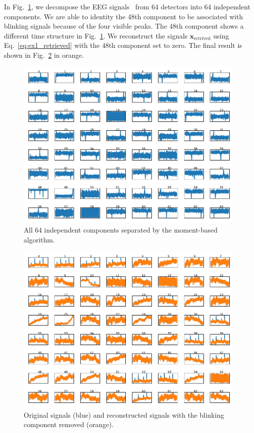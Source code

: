 \documentclass[aps,prl,preprint,superscriptaddress]{revtex4-2}
\begin{document}
In Fig.~\ref{fig:ex3_ica}, we decompose the EEG signals~\cite{talebi2021eeg} from 64 detectors into 64 independent components.
We are able to identity the 48th component to be associated with blinking signals because of the four visible peaks.
The 48th component shows a different time structure in Fig.~\ref{fig:ex3_ica}.
We reconstruct the signals $\mathbf{x}_{\mathrm{retrived}}$ using Eq.~\ref{eq:ex1_retrieved} with the 48th component set to zero.
The final result is shown in Fig.~\ref{fig:ex3_noblinks} in orange.
\begin{figure}
\includegraphics{scripts/ex3_ica.pdf}
\caption{\label{fig:ex3_ica} All 64 independent components separated by the moment-based algorithm.}
\end{figure}
\begin{figure}
\includegraphics{scripts/ex3_noblinks.pdf}
\caption{\label{fig:ex3_noblinks} Original signals (blue) and reconstructed signals with the blinking component removed (orange).}
\end{figure}
\end{document}

